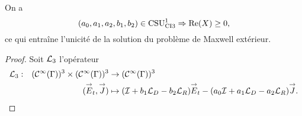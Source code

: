  \begin{prop}
    \label{prop:csu:ci3-1}
    On a 
    \begin{equation*}
      (a_0,a_1,a_2,b_1,b_2) \in \CSU[1]{CI3} \Rightarrow \Re(X)\ge 0,
    \end{equation*}
    ce qui entraîne l'unicité de la solution du problème de Maxwell extérieur.
  \end{prop}

  \begin{proof}
    Soit \(\LL_3\) l'opérateur
    \begin{equation}
      \label{eq:unicite:ci3:L3}
      \fonction{\LL_3}{(\mathcal{C}^\infty(\Gamma))^3 \times (\mathcal{C}^\infty(\Gamma))^3}{(\mathcal{C}^\infty(\Gamma))^3}
      {(\vE_t,\vJ)}{( \oI + b_1 \LD - b_2 \LR) \vE_t - (a_0\oI + a_1 \LD - a_2 \LR ) \vJ.}
    \end{equation}


\end{proof}
